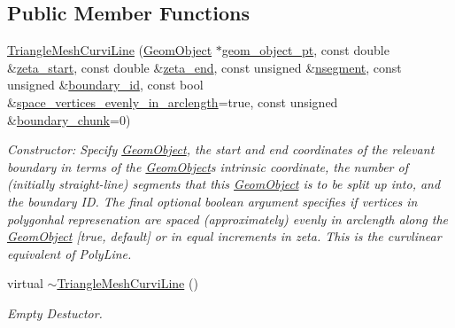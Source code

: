 \subsection*{Public Member Functions}
\begin{DoxyCompactItemize}
\item 
\hyperlink{classoomph_1_1TriangleMeshCurviLine_aa31bdc0d13e7d8851eced042a471ecdf}{Triangle\+Mesh\+Curvi\+Line} (\hyperlink{classoomph_1_1GeomObject}{Geom\+Object} $\ast$\hyperlink{classoomph_1_1TriangleMeshCurviLine_a037242aaee2ba082658f87db87f6ef69}{geom\+\_\+object\+\_\+pt}, const double \&\hyperlink{classoomph_1_1TriangleMeshCurviLine_a6c0067c06cce020c85e3fe9b1737ce57}{zeta\+\_\+start}, const double \&\hyperlink{classoomph_1_1TriangleMeshCurviLine_acecf95595d14b777bf6ac2ddd9327f8b}{zeta\+\_\+end}, const unsigned \&\hyperlink{classoomph_1_1TriangleMeshCurviLine_af5ee48a8cb78c2c2954a14241b5b1489}{nsegment}, const unsigned \&\hyperlink{classoomph_1_1TriangleMeshCurviLine_acb7ae5fdae67480a0e797da29d518aee}{boundary\+\_\+id}, const bool \&\hyperlink{classoomph_1_1TriangleMeshCurviLine_aeebdc2c7b0bfe0e577ba1b6c93b38895}{space\+\_\+vertices\+\_\+evenly\+\_\+in\+\_\+arclength}=true, const unsigned \&\hyperlink{classoomph_1_1TriangleMeshCurviLine_a42b8ef1fb0ad0078413d0fedc87af679}{boundary\+\_\+chunk}=0)
\begin{DoxyCompactList}\small\item\em Constructor\+: Specify \hyperlink{classoomph_1_1GeomObject}{Geom\+Object}, the start and end coordinates of the relevant boundary in terms of the \hyperlink{classoomph_1_1GeomObject}{Geom\+Object}\textquotesingle{}s intrinsic coordinate, the number of (initially straight-\/line) segments that this \hyperlink{classoomph_1_1GeomObject}{Geom\+Object} is to be split up into, and the boundary ID. The final optional boolean argument specifies if vertices in polygonhal represenation are spaced (approximately) evenly in arclength along the \hyperlink{classoomph_1_1GeomObject}{Geom\+Object} \mbox{[}true, default\mbox{]} or in equal increments in zeta. This is the curvlinear equivalent of Poly\+Line. \end{DoxyCompactList}\item 
virtual \hyperlink{classoomph_1_1TriangleMeshCurviLine_ab08a474ba9e5067b239aba84ab998710}{$\sim$\+Triangle\+Mesh\+Curvi\+Line} ()
\begin{DoxyCompactList}\small\item\em Empty Destuctor. \end{DoxyCompactList}\item 

\end{DoxyCompactItemize}
